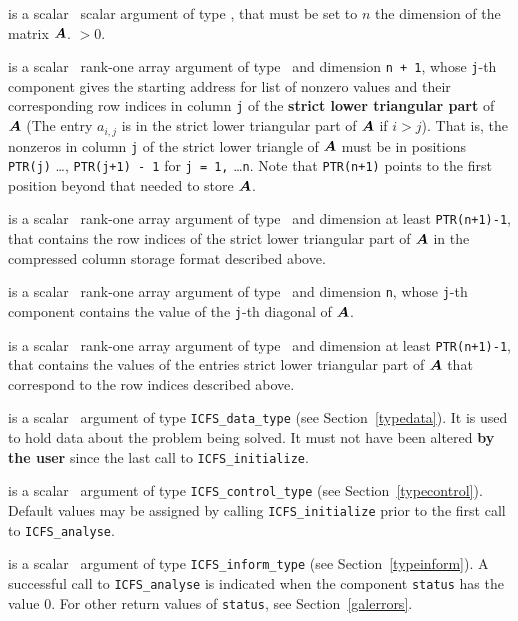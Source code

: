 \documentclass{galahad}
\newcommand{\packagename}{ICFS}
\begin{document}
\vspace*{-2mm}
\begin{description}
is a scalar \intentin\ scalar argument of type \integer, that must be
set to $n$ the dimension of the matrix ${\bm{A}}$.
 $> 0$.

 is a scalar \intentin\ rank-one array argument of type
\integer\ and dimension {\tt n + 1}, whose {\tt j}-th component
gives the starting address for list of nonzero values and their
corresponding row  indices in column {\tt j} of the
{\bf strict lower triangular part} of ${\bm{A}}$ (The entry $a_{i,j}$ is in
the strict lower triangular part of ${\bm{A}}$ if $i > j$).
That is, the nonzeros in column {\tt j} of the strict lower triangle of
${\bm{A}}$ must be in positions {\tt PTR(j)} \ldots, {\tt PTR(j+1) - 1} for
{\tt j = 1,} \ldots {\tt n}.
Note that {\tt PTR(n+1)} points to the first position beyond that needed
to store ${\bm{A}}$.

 is a scalar \intentin\ rank-one array argument of type
\integer\ and dimension at least {\tt  PTR(n+1)-1},
that contains the row indices of the strict lower triangular part of ${\bm{A}}$
in the compressed column storage format described above.

 is a scalar \intentin\ rank-one array argument of type
\realdp\ and dimension {\tt n}, whose {\tt j}-th component
contains the value of the {\tt j}-th diagonal of ${\bm{A}}$.

 is a scalar \intentin\ rank-one array argument of type
\realdp\ and dimension at least {\tt  PTR(n+1)-1},
that contains the values of the entries strict lower triangular part of ${\bm{A}}$
that correspond to the row indices described above.

 is a scalar \intentinout\ argument of type
{\tt \packagename\_data\_type}
(see Section~\ref{typedata}). It is used to hold data about the problem being
solved. It must not have been altered {\bf by the user} since the last call to
{\tt \packagename\_initialize}.

 is a scalar \intentin\ argument of type
{\tt \packagename\_control\_type}
(see Section~\ref{typecontrol}). Default values may be assigned by calling
{\tt \packagename\_initialize} prior to the first call to
{\tt \packagename\_analyse}.

 is a scalar \intentinout\ argument of type
{\tt \packagename\_inform\_type}
(see Section~\ref{typeinform}).
A successful call to
{\tt \packagename\_analyse}
is indicated when the  component {\tt status} has the value 0.
For other return values of {\tt status}, see Section~\ref{galerrors}.

\end{description}
\end{document}
